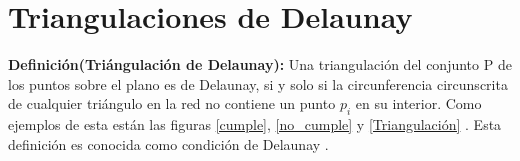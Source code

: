 \documentclass[12pt]{report}
\begin{document}

\section{Triangulaciones de Delaunay}
\textbf{Definición(Triángulación de Delaunay):} Una triangulación del conjunto P de los puntos sobre el plano es de Delaunay, si y solo si la circunferencia circunscrita de cualquier triángulo en la red no contiene un punto $p_i$ en su interior. Como ejemplos de esta están las figuras \ref{cumple}, \ref{no_cumple} y \ref{Triangulación} . Esta definición es conocida como condición de Delaunay \cite{26,27,28}.\\    
\end{document}
